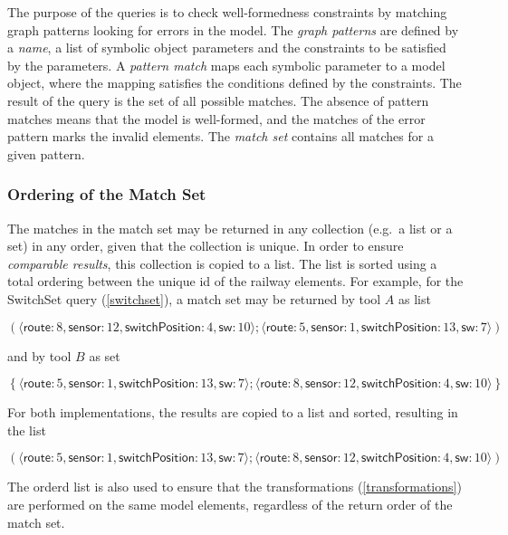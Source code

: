 \documentclass[submission,copyright,creativecommons]{eptcs}
\begin{document}
The purpose of the queries is to check well-formedness constraints by matching graph patterns looking for errors in the model. The \emph{graph patterns} are defined by a \emph{name}, a list of symbolic object parameters and the constraints to be satisfied by the parameters. A \emph{pattern match} maps each symbolic parameter to a model object, where the mapping satisfies the conditions defined by the constraints. The result of the query is the set of all possible matches. The absence of pattern matches means that the model is well-formed, and the matches of the error pattern marks the invalid elements. The \emph{match set} contains all matches for a given pattern.

\subsubsection{Ordering of the Match Set}

The matches in the match set may be returned in any collection (e.g.\ a list or a set) in any order, given that the collection is unique. In order to ensure \emph{comparable results}, this collection is copied to a list. The list is sorted using a total ordering between the unique id of the railway elements. For example, for the \textsf{SwitchSet} query (\autoref{switchset}), a match set may be returned by tool $A$ as list

$$\left(
\langle\textsf{route}: 8, \textsf{sensor}: 12, \textsf{switchPosition}: 4, \textsf{sw}: 10\rangle;
\langle\textsf{route}: 5, \textsf{sensor}: 1, \textsf{switchPosition}: 13, \textsf{sw}: 7\rangle
\right)$$

and by tool $B$ as set

$$\left\{
\langle\textsf{route}: 5, \textsf{sensor}: 1, \textsf{switchPosition}: 13, \textsf{sw}: 7\rangle;
\langle\textsf{route}: 8, \textsf{sensor}: 12, \textsf{switchPosition}: 4, \textsf{sw}: 10\rangle
\right\}$$

For both implementations, the results are copied to a list and sorted, resulting in the list

$$\left(
\langle\textsf{route}: 5, \textsf{sensor}: 1, \textsf{switchPosition}: 13, \textsf{sw}: 7\rangle;
\langle\textsf{route}: 8, \textsf{sensor}: 12, \textsf{switchPosition}: 4, \textsf{sw}: 10\rangle
\right)$$

The orderd list is also used to ensure that the transformations (\autoref{transformations}) are performed on the same model elements, regardless of the return order of the match set.
\end{document}
